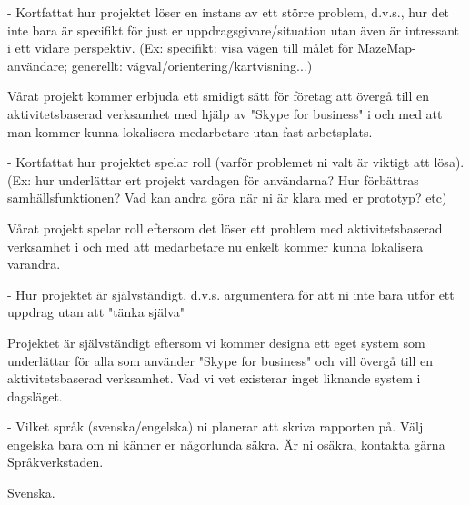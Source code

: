- Kortfattat hur projektet löser en instans av ett större problem, d.v.s., hur det inte bara är specifikt för just er uppdragsgivare/situation utan även är intressant i ett vidare perspektiv. (Ex: specifikt: visa vägen till målet för MazeMap-användare; generellt: vägval/orientering/kartvisning...)

  Vårat projekt kommer erbjuda ett smidigt sätt för företag att övergå till en aktivitetsbaserad verksamhet med hjälp av "Skype for business" i och med att man kommer kunna lokalisera medarbetare utan fast arbetsplats.

- Kortfattat hur projektet spelar roll (varför problemet ni valt är viktigt att lösa). (Ex: hur underlättar ert projekt vardagen för användarna? Hur förbättras samhällsfunktionen? Vad kan andra göra när ni är klara med er prototyp? etc)

  Vårat projekt spelar roll eftersom det löser ett problem med aktivitetsbaserad verksamhet i och med att medarbetare nu enkelt kommer kunna lokalisera varandra.

- Hur projektet är självständigt, d.v.s. argumentera för att ni inte bara utför ett uppdrag utan att "tänka själva"

  Projektet är självständigt eftersom vi kommer designa ett eget system som underlättar för alla som använder "Skype for business" och vill övergå till en aktivitetsbaserad verksamhet. Vad vi vet existerar inget liknande system i dagsläget.

- Vilket språk (svenska/engelska) ni planerar att skriva rapporten på. Välj engelska bara om ni känner er någorlunda säkra. Är ni osäkra, kontakta gärna Språkverkstaden.

  Svenska.
